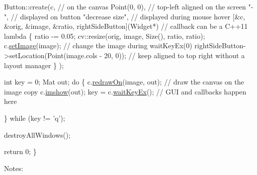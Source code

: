 \begin{DoxyCode}
    Button::create(c,                               \textcolor{comment}{// on the canvas}
                   Point(0, 0),                     \textcolor{comment}{// top-left aligned on the screen}
                   \textcolor{stringliteral}{"-"},                             \textcolor{comment}{// displayed on button}
                   \textcolor{stringliteral}{"decrease size"},                 \textcolor{comment}{// displayed during mouse hover}
                   [&c, &orig, &image, &ratio, rightSideButton](Widget*) \textcolor{comment}{// callback can be a C++11 lambda}
    \{
        ratio -= 0.05;
        cv::resize(orig, image, Size(), ratio, ratio);
        c.\hyperlink{classcanvascv_1_1Canvas_a441c5882c7ebebd454a306b3c3478ae7}{setImage}(image);  \textcolor{comment}{// change the image during waitKeyEx(0)}
        rightSideButton->setLocation(Point(image.cols - 20, 0)); \textcolor{comment}{// keep aligned to top right without a
       layout manager}
    \}
    );

    \textcolor{keywordtype}{int} key = 0;
    Mat out;
    \textcolor{keywordflow}{do}
    \{
        c.\hyperlink{classcanvascv_1_1Canvas_a018c66e277de7904b8146ea3f3feebdd}{redrawOn}(image, out);  \textcolor{comment}{// draw the canvas on the image copy}
        c.\hyperlink{classcanvascv_1_1Canvas_acaf9494a5668046dd0a8908aa97a7a43}{imshow}(out);
        key = c.\hyperlink{classcanvascv_1_1Canvas_a59397db05f5d9e45264f626f6a2ae528}{waitKeyEx}(); \textcolor{comment}{// GUI and callbacks happen here}

    \} \textcolor{keywordflow}{while} (key != \textcolor{charliteral}{'q'});

    destroyAllWindows();

    \textcolor{keywordflow}{return} 0;
\}
\end{DoxyCode}
 Notes\+:
